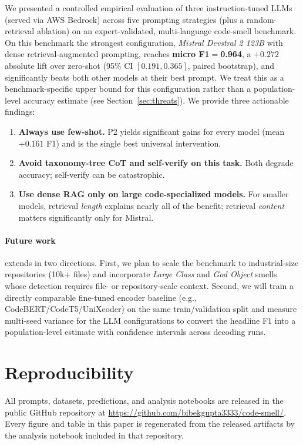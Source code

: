 \documentclass[conference]{IEEEtran}
\begin{document}
We presented a controlled empirical evaluation of three instruction-tuned
LLMs (served via AWS Bedrock) across five prompting strategies (plus a
random-retrieval ablation) on an expert-validated, multi-language
code-smell benchmark. On this benchmark the strongest
configuration, \textit{Mistral Devstral 2 123B} with dense
retrieval-augmented prompting, reaches \textbf{micro F1$=$0.964}, a
$+0.272$ absolute lift over zero-shot (95\% CI $[0.191, 0.365]$, paired
bootstrap), and significantly beats both other models at their best
prompt. We treat this as a benchmark-specific upper bound for this
configuration rather than a population-level accuracy estimate (see
Section~\ref{sec:threats}). We provide three actionable
findings:
\begin{enumerate}
 \item \textbf{Always use few-shot.} P2 yields significant gains for every
 model (mean $+0.161$ F1) and is the single best universal intervention.
 \item \textbf{Avoid taxonomy-tree CoT and self-verify on this task.} Both
 degrade accuracy; self-verify can be catastrophic.
 \item \textbf{Use dense RAG only on large code-specialized models.} For
 smaller models, retrieval \emph{length} explains nearly all of the
 benefit; retrieval \emph{content} matters significantly only for Mistral.
\end{enumerate}

\paragraph*{Future work} extends in two directions. First, we plan to scale
the benchmark to industrial-size repositories (10k+ files) and incorporate
\textit{Large Class} and \textit{God Object} smells whose detection requires
file- or repository-scale context. Second, we will train a directly
comparable fine-tuned encoder baseline (e.g., CodeBERT/CodeT5/UniXcoder)
on the same train/validation split and measure multi-seed variance for
the LLM configurations to convert the headline F1 into a population-level
estimate with confidence intervals across decoding runs.

\section*{Reproducibility}
All prompts, datasets, predictions, and analysis notebooks are released
in the public GitHub repository at
\url{https://github.com/bibekgupta3333/code-smell/}.
Every figure and table in this paper is regenerated from the released
artifacts by the analysis notebook included in that repository.
\end{document}
